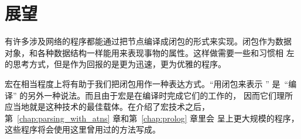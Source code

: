 \section{展望}
\label{sec:looking_forward}

有许多涉及网络的程序都能通过把节点编译成闭包的形式来实现。闭包作为数据
对象，和各种数据结构一样能用来表现事物的属性。这样做需要一些和习惯相
左的思考方式，但是作为回报的是更为迅速，更为优雅的程序。

宏在相当程度上将有助于我们把闭包用作一种表达方式。``用闭包来表示
'' 是~``编译'' 的另外一种说法。而且由于宏是在编译时完成它们的工作的，
因而它们理所应当地就是这种技术的最佳载体。在介绍了宏技术之后，
第~\ref{chap:parsing_with_atns} 章和第~\ref{chap:prolog} 章里会
呈上更大规模的程序，这些程序将会使用这里曾用过的方法写成。

